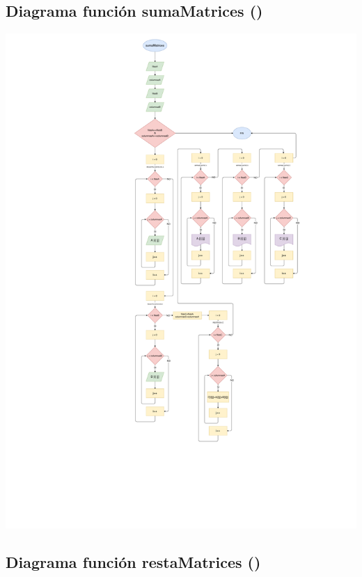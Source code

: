 \documentclass[letter]{revtex4}
\begin{document}
\clearpage

\subsection{Diagrama función sumaMatrices ()}
\begin{center}
 	\includegraphics[scale=0.3]{Images/Suma.pdf}
 	\label{figura4}
 \end{center}
\clearpage


\subsection{Diagrama función restaMatrices ()}
\end{document}
